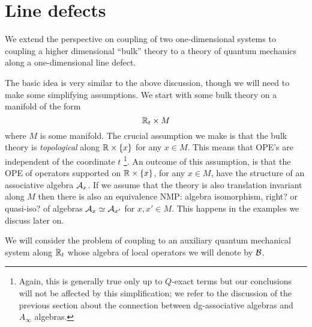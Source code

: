 \documentclass[11pt]{amsart}
\def\brian#1{{\textcolor{blue!65!red}{BRW: {#1}}}}
\def\natalie#1{{\textcolor{green!65!black}{NMP: {#1}}}}
\begin{document}




\section{Line defects}
\label{s:lines}


We extend the perspective on coupling of two one-dimensional systems to coupling a higher dimensional ``bulk'' theory to a theory of quantum mechanics along a one-dimensional line defect. 

The basic idea is very similar to the above discussion, though we will need to make some simplifying assumptions. 
We start with some bulk theory on a manifold of the form 
\[
\mathbb R_t \times M 
\] 
where $M$ is some manifold. 
The crucial assumption we make is that the bulk theory is {\em topological} along $\mathbb R \times \{x\}$ for any $x \in M$. 
This means that OPE's are independent of the coordinate $t$ \footnote{Again, this is generally true only up to $Q$-exact terms but our conclusions will not be affected by this simplification; we refer to the discussion of the previous section about the connection between dg-associative algebras and $A_{\infty}$ algebras.}.
An outcome of this assumption, is that the OPE of operators supported on $\mathbb R \times \{x\}$, for any $x \in M$, have the structure of an associative algebra $\mathcal A_x$. 
If we assume that the theory is also translation invariant along $M$ then there is also an equivalence \natalie{algebra isomorphism, right? or quasi-iso?} of algebras $\mathcal A_x \simeq \mathcal A_{x'}$ for $x, x' \in M$. 
This happens in the examples we discuss later on.

We will consider the problem of coupling to an auxiliary quantum mechanical system along $\mathbb R_t$ whose algebra of local operators we will denote by $\mathcal B$. 
\end{document}
